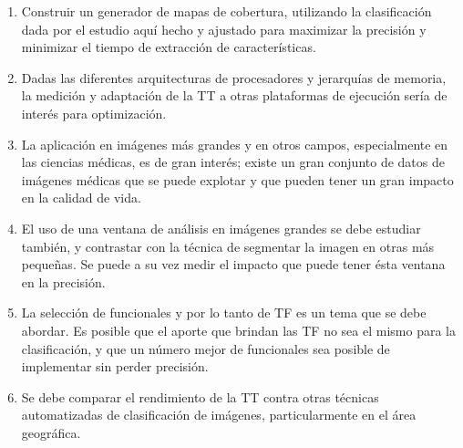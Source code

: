 \begin{enumerate}

\item Construir un generador de mapas de cobertura, utilizando la clasificación dada por el estudio aquí hecho y ajustado para maximizar la precisión y minimizar el tiempo de extracción de características.

\item Dadas las diferentes arquitecturas de procesadores y jerarquías de memoria, la medición y adaptación de la TT a otras plataformas de ejecución sería de interés para optimización.

\item La aplicación en imágenes más grandes y en otros campos, especialmente en las ciencias médicas, es de gran interés; existe un gran conjunto de datos de imágenes médicas que se puede explotar y que pueden tener un gran impacto en la calidad de vida.

\item El uso de una ventana de análisis en imágenes grandes se debe estudiar también, y contrastar con la técnica de segmentar la imagen en otras más pequeñas. Se puede a su vez medir el impacto que puede tener ésta ventana en la precisión.

\item La selección de funcionales y por lo tanto de TF es un tema que se debe abordar. Es posible que el aporte que brindan las TF no sea el mismo para la clasificación, y que un número mejor de funcionales sea posible de implementar sin perder precisión.

\item Se debe comparar el rendimiento de la TT contra otras técnicas automatizadas de clasificación de imágenes, particularmente en el área geográfica.
\end{enumerate}

